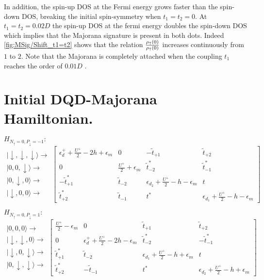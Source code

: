 In addition, the spin-up DOS at the Fermi energy grows faster than the spin-down DOS, breaking the initial spin-symmetry when $t_1=t_2=0$. At $t_1=t_2=0.02D$ the spin-up DOS at the fermi energy doubles the spin-down DOS which implies that the Majorana signature  is present in both dots. %
Indeed \ref{fig:MSig/Shift_t1=t2} shows that the relation $\frac{\rho_\uparrow(0)}{\rho_\uparrow(0)}$ increases continuously from $1$ to $2$. Note that the Majorana is completely attached when the coupling $t_1$ reaches the order of $0.01D$ .

\section{Initial DQD-Majorana Hamiltonian.\label{chap:Double-Dot-Majorana-Hamiltonian.}}

$H_{N_{\uparrow}=0,P_{\downarrow}=-1}:$
\[
\begin{array}{c}
\vert\downarrow,\downarrow,\downarrow\rangle\rightarrow\\
\vert0,0,\downarrow\rangle\rightarrow\\
\vert0,\downarrow,0\rangle\rightarrow\\
\vert\downarrow,0,0\rangle\rightarrow
\end{array}\left[\begin{array}{cccc}
\epsilon_{d}^{+}+\frac{U^{+}}{2}-2h+\epsilon_{m} & 0 & -\tilde{t}_{+1} & \tilde{t}_{+2}\\
0 & \frac{U^{+}}{2}+\epsilon_{m} & \tilde{t}_{-2}^{*} & \tilde{t}_{-1}^{*}\\
-\tilde{t}_{+1}^{*} & \tilde{t}_{-2} & \epsilon_{d_{2}}+\frac{U^{+}}{2}-h-\epsilon_{m} & t\\
\tilde{t}_{+2}^{*} & \tilde{t}_{-1} & t^{*} & \epsilon_{d_{1}}+\frac{U^{+}}{2}-h-\epsilon_{m}
\end{array}\right]
\]


$H_{N_{\uparrow}=0,P_{\downarrow}=1}:$
\[
\begin{array}{c}
\vert0,0,0\rangle\rightarrow\\
\vert\downarrow,\downarrow,0\rangle\rightarrow\\
\vert\downarrow,0,\downarrow\rangle\rightarrow\\
\vert0,\downarrow,\downarrow\rangle\rightarrow
\end{array}\left[\begin{array}{cccc}
\frac{U^{+}}{2}-\epsilon_{m} & 0 & \tilde{t}_{+1} & \tilde{t}_{+2}\\
0 & \epsilon_{d}^{+}+\frac{U^{+}}{2}-2h-\epsilon_{m} & \tilde{t}_{-2}^{*} & -\tilde{t}_{-1}^{*}\\
\tilde{t}_{+1}^{*} & \tilde{t}_{-2} & \epsilon_{d_{1}}+\frac{U^{+}}{2}-h+\epsilon_{m} & t\\
\tilde{t}_{+2}^{*} & -\tilde{t}_{-1} & t^{*} & \epsilon_{d_{2}}+\frac{U^{+}}{2}-h+\epsilon_{m}
\end{array}\right]
\]


